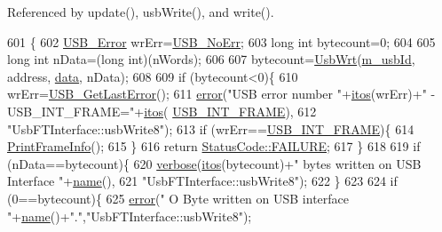Referenced by update(), usb\+Write(), and write().


\begin{DoxyCode}
601                                                              \{
602   \hyperlink{LALUsbML_8h_aa7e5a2302774d5aa1d48a2a1cfc46e86}{USB\_Error} wrErr=\hyperlink{LALUsbML_8h_ab44759ae95dd86cbc2855adf525c43cd}{USB\_NoErr};
603   \textcolor{keywordtype}{long} \textcolor{keywordtype}{int}  bytecount=0;
604 
605   \textcolor{keywordtype}{long} \textcolor{keywordtype}{int} nData=(\textcolor{keywordtype}{long} int)(nWords);
606 
607   bytecount=\hyperlink{LALUsbML_8h_a417eaf04d96bd2d3fca0111f8003bcb0}{UsbWrt}(\hyperlink{classUsbFTInterface_a91df5c0547e8be460bc087e27afe05aa}{m\_usbId}, address, \hyperlink{namespaceshell_a5ea2525995cedc3efd69ea8a7f034d1e}{data}, nData);
608 
609   \textcolor{keywordflow}{if} (bytecount<0)\{
610     wrErr=\hyperlink{LALUsbML_8h_a1662b77c9968848acf173f6f9c765ddd}{USB\_GetLastError}();
611     \hyperlink{classObject_a204a95f57818c0f811933917a30eff45}{error}(\textcolor{stringliteral}{"USB error number "}+\hyperlink{Tools_8h_af330027dbdafb9a30768b3613c553e60}{itos}(wrErr)+\textcolor{stringliteral}{" - USB\_INT\_FRAME="}+\hyperlink{Tools_8h_af330027dbdafb9a30768b3613c553e60}{itos}(
      \hyperlink{LALUsbML_8h_a68260f9cf3649507d12904cfa1592c11afd1c409187b1dfd3d66887a5e07e7ed3}{USB\_INT\_FRAME}),
612             \textcolor{stringliteral}{"UsbFTInterface::usbWrite8"});
613     \textcolor{keywordflow}{if} (wrErr==\hyperlink{LALUsbML_8h_a68260f9cf3649507d12904cfa1592c11afd1c409187b1dfd3d66887a5e07e7ed3}{USB\_INT\_FRAME})\{
614       \hyperlink{LALUsbML_8h_ab3398c17204ba7fb4b47eb9bbf4ba94e}{PrintFrameInfo}();
615     \} 
616     \textcolor{keywordflow}{return} \hyperlink{classStatusCode_a6f565cbeadc76d14c72f047e5e85eb4ba3da73d4c469762eb9d3c960368252b26}{StatusCode::FAILURE};
617   \}
618 
619   \textcolor{keywordflow}{if} (nData==bytecount)\{
620     \hyperlink{classObject_a83d2db2df682907ea1115ad721c1c4a1}{verbose}(\hyperlink{Tools_8h_af330027dbdafb9a30768b3613c553e60}{itos}(bytecount)+\textcolor{stringliteral}{" bytes written on USB Interface "}+\hyperlink{classObject_a300f4c05dd468c7bb8b3c968868443c1}{name}(),
621             \textcolor{stringliteral}{"UsbFTInterface::usbWrite8"});
622   \}
623   
624   \textcolor{keywordflow}{if} (0==bytecount)\{
625     \hyperlink{classObject_a204a95f57818c0f811933917a30eff45}{error}(\textcolor{stringliteral}{" O Byte written on USB interface "}+\hyperlink{classObject_a300f4c05dd468c7bb8b3c968868443c1}{name}()+\textcolor{stringliteral}{"."},\textcolor{stringliteral}{"UsbFTInterface::usbWrite8"});

\end{DoxyCode}
